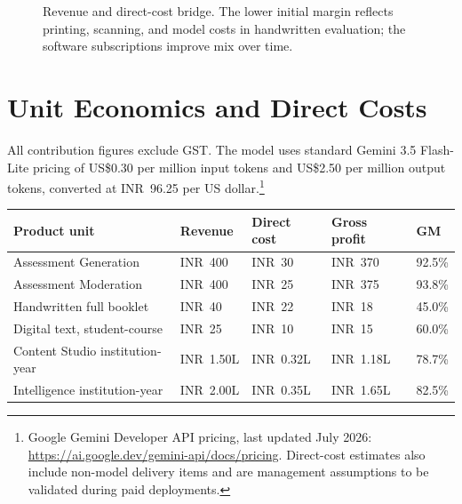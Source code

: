 \documentclass[11pt,a4paper]{article}
\newcommand{\rs}{INR}
\begin{document}
\begin{figure}[H]
\centering
{}
\caption{Revenue and direct-cost bridge. The lower initial margin reflects printing, scanning, and model costs in handwritten evaluation; the software subscriptions improve mix over time.}
\end{figure}
\FloatBarrier

\section{Unit Economics and Direct Costs}

All contribution figures exclude GST. The model uses standard Gemini 3.5 Flash-Lite pricing of US\$0.30 per million input tokens and US\$2.50 per million output tokens, converted at \rs\ 96.25 per US dollar.\footnote{Google Gemini Developer API pricing, last updated July 2026: \url{https://ai.google.dev/gemini-api/docs/pricing}. Direct-cost estimates also include non-model delivery items and are management assumptions to be validated during paid deployments.}

\begin{tabularx}{\textwidth}{L{0.28\textwidth}>{\raggedleft\arraybackslash}p{0.16\textwidth}>{\raggedleft\arraybackslash}p{0.16\textwidth}>{\raggedleft\arraybackslash}p{0.16\textwidth}Y}
\toprule
\textbf{Product unit} & \textbf{Revenue} & \textbf{Direct cost} & \textbf{Gross profit} & \textbf{GM} \\
\midrule
Assessment Generation & \rs\ 400 & \rs\ 30 & \rs\ 370 & 92.5\% \\
Assessment Moderation & \rs\ 400 & \rs\ 25 & \rs\ 375 & 93.8\% \\
Handwritten full booklet & \rs\ 40 & \rs\ 22 & \rs\ 18 & 45.0\% \\
Digital text, student-course & \rs\ 25 & \rs\ 10 & \rs\ 15 & 60.0\% \\
Content Studio institution-year & \rs\ 1.50L & \rs\ 0.32L & \rs\ 1.18L & 78.7\% \\
Intelligence institution-year & \rs\ 2.00L & \rs\ 0.35L & \rs\ 1.65L & 82.5\% \\
\bottomrule
\end{tabularx}
\end{document}
